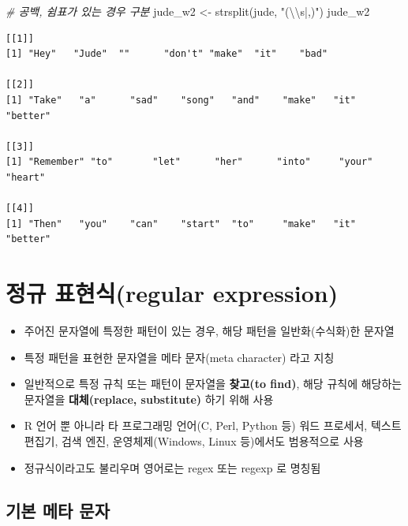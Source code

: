 \documentclass[
  11pt,
]{krantz}
\newenvironment{Shaded}{\begin{snugshade}}{\end{snugshade}}
\newcommand{\CommentTok}[1]{\textcolor[rgb]{0.37,0.37,0.37}{\textit{#1}}}
\newcommand{\FunctionTok}[1]{\textcolor[rgb]{0,0,0}{#1}}
\newcommand{\NormalTok}[1]{#1}
\newcommand{\OtherTok}[1]{\textcolor[rgb]{0.37,0.37,0.37}{#1}}
\newcommand{\SpecialCharTok}[1]{\textcolor[rgb]{0,0,0}{#1}}
\newcommand{\StringTok}[1]{\textcolor[rgb]{0.5,0.5,0.5}{#1}}
\begin{document}
\begin{Shaded}
\begin{Highlighting}[]
\CommentTok{\# 공백, 쉼표가 있는 경우 구분}
\NormalTok{jude\_w2 }\OtherTok{\textless{}{-}} \FunctionTok{strsplit}\NormalTok{(jude, }\StringTok{"(}\SpecialCharTok{\textbackslash{}\textbackslash{}}\StringTok{s|,)"}\NormalTok{)}
\NormalTok{jude\_w2}
\end{Highlighting}
\end{Shaded}

\begin{verbatim}
[[1]]
[1] "Hey"   "Jude"  ""      "don't" "make"  "it"    "bad"  

[[2]]
[1] "Take"   "a"      "sad"    "song"   "and"    "make"   "it"     "better"

[[3]]
[1] "Remember" "to"       "let"      "her"      "into"     "your"     "heart"   

[[4]]
[1] "Then"   "you"    "can"    "start"  "to"     "make"   "it"     "better"
\end{verbatim}

\normalsize

\hypertarget{reg-exp}{%
\section{정규 표현식(regular expression)}\label{reg-exp}}

\begin{itemize}
\item
  주어진 문자열에 특정한 패턴이 있는 경우, 해당 패턴을 일반화(수식화)한 문자열
\item
  특정 패턴을 표현한 문자열을 메타 문자(meta character) 라고 지칭
\item
  일반적으로 특정 규칙 또는 패턴이 문자열을 \textbf{찾고(to find)}, 해당 규칙에 해당하는 문자열을 \textbf{대체(replace, substitute)} 하기 위해 사용
\item
  R 언어 뿐 아니라 타 프로그래밍 언어(C, Perl, Python 등) 워드 프로세서, 텍스트 편집기, 검색 엔진, 운영체제(Windows, Linux 등)에서도 범용적으로 사용
\item
  정규식이라고도 불리우며 영어로는 regex 또는 regexp 로 명칭됨
\end{itemize}

\hypertarget{basic-meta}{%
\subsection{기본 메타 문자}\label{basic-meta}}
\end{document}
